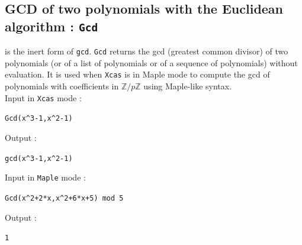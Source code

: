 \documentclass[a4paper,11pt]{book}
\newcommand{\Z}{{\mathbb{Z}}}
\begin{document}
\subsection{GCD of two polynomials with the Euclidean algorithm : {\tt Gcd}}
  is the inert form of  {\tt gcd}.
{\tt Gcd} returns the gcd (greatest common divisor) of two polynomials
(or of a list of polynomials or of a sequence of polynomials) without
evaluation. It is used when {\tt Xcas} is in Maple mode to compute
the gcd of polynomials with coefficients in $\Z/p\Z$ using Maple-like syntax.\\
Input in {\tt Xcas} mode  :
\begin{center}{\tt Gcd(x\verb|^|3-1,x\verb|^|2-1)}\end{center}
Output :
\begin{center}{\tt gcd(x\verb|^|3-1,x\verb|^|2-1)}\end{center}
Input in {\tt Maple} mode  :
\begin{center}{\tt Gcd(x\verb|^|2+2*x,x\verb|^|2+6*x+5) mod 5}\end{center}
Output :
\begin{center}{\tt 1}\end{center}
\end{document}
